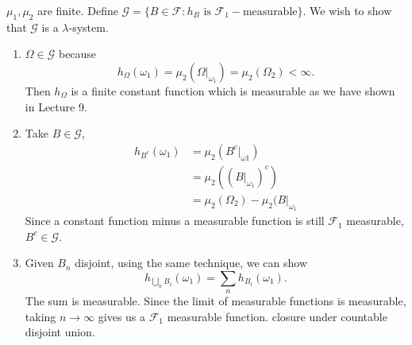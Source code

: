 \documentclass[class=article,crop=false]{standalone}
\begin{document}
\begin{prf}
\begin{case}[1]
	$ \mu_1 , \mu_2$ are finite. Define $ \mathcal{G}= \{B \in \mathcal{F}: h_{B} \text{ is }\mathcal{F}_1 - \text{measurable}  \} $. We wish to show that $ \mathcal{G}$ is a $\lambda$-system.
	\begin{enumerate}[label=(\roman*)]
		\item $ \Omega \in \mathcal{G}$ because 
			\[
				h_{\Omega}(\omega_1) = \mu_2(\Omega\big|_{\omega_1}) = \mu_2(\Omega_2) < \infty
			.\] 
			Then $ h_\Omega $ is a finite constant function which is measurable as we have shown in Lecture 9.
		\item Take $ B \in \mathcal{G}$, 
			\begin{align*}
				h_{B^{c}}(\omega_1) &= \mu_2(B^{c}\big|_{\omega1}) \\
						    &= \mu_2((B\big|_{\omega_1})^{c}) \\
						    &= \mu_2(\Omega_2) - \mu_2(B\big|_{\omega_1} 
			\end{align*}
			Since a constant function minus a measurable function is still $ \mathcal{F}_1$ measurable, $ B^{c} \in \mathcal{G}$.
		\item Given $ B_n$ disjoint, using the same technique, we can show 
\[
	h_{\bigcup_{n} B_i } (\omega_1)= \sum_n h_{B_i} (\omega_1)
.\] 
The sum is measurable. Since the limit of measurable functions is measurable, taking $ n \to \infty$ gives us a $ \mathcal{F}_1$ measurable function.
			closure under countable disjoint union.
	\end{enumerate}
\end{case}
\end{prf}
\end{document}

